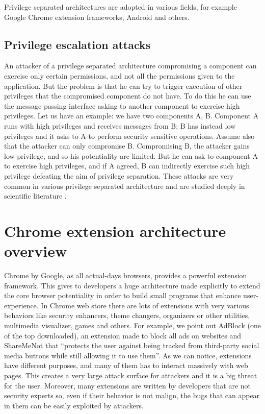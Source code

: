 Privilege separated architectures are adopted in various fields, for example Google Chrome extension frameworks, Android and others.

\subsection{Privilege escalation attacks}
\label{sec:Escalation}
An attacker of a privilege separated architecture compromising a component can exercise only certain permissions, and not all the permissions given to the application. But the problem is that he can try to trigger execution of other privileges that the compromised component do not have. To do this he can use the message passing interface asking to another component to exercise high privileges. Let us have an example:
we have two components A, B. Component A runs with high privileges and receives messages from B; B has instead low privileges and it asks to A to perform security sensitive operations. Assume also that the attacker can only compromise B. Compromising B, the attacker gains low privilege, and so his potentiality are limited. But he can ask to component A to exercise high privileges, and if A agreed, B can indirectly exercise such high privilege defeating the aim of privilege separation. These attacks are very common in various privilege separated architecture and are studied deeply in scientific literature \cite{Lintent, AndroidPrivilegeEscalation}.

\section{Chrome extension architecture overview}
\label{sec:ExtOverview}
Chrome by Google, as all actual-days browsers, provides a powerful extension framework. This gives to developers a huge architecture made explicitly to extend the core browser potentiality in order to build small programs that enhance user-experience. In Chrome web store there are lots of extensions with very various behaviors like security enhancers, theme changers, organizers or other utilities, multimedia visualizer, games and others. For example, we point out AdBlock (one of the top downloaded), an extension made to block all ads on websites and ShareMeNot that ``protects the user against being tracked from third-party social media buttons while still allowing it to use them''\cite{ShareMeNot}. As we can notice, extensions have different purposes, and many of them has to interact massively with web pages. This creates a very large attack surface for attackers and it is a big threat for the user. Moreover, many extensions are written by developers that are not security experts so, even if their behavior is not malign, the bugs that can appear in them can be easily exploited by attackers.

